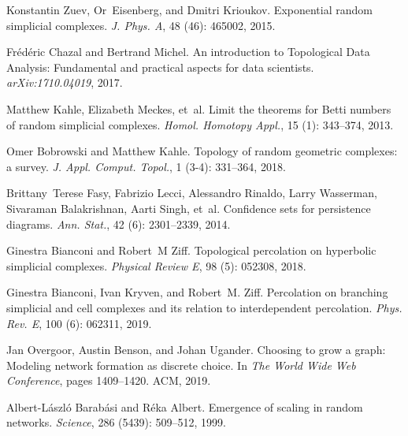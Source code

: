 Konstantin Zuev, Or~Eisenberg, and Dmitri Krioukov.
\newblock Exponential random simplicial complexes.
\newblock \emph{J. Phys. A}, 48 (46): 465002, 2015.

Fr{\'e}d{\'e}ric Chazal and Bertrand Michel.
\newblock An introduction to {{Topological Data Analysis}}: Fundamental and
practical aspects for data scientists.
\newblock \emph{arXiv:1710.04019}, 2017.

Matthew Kahle, Elizabeth Meckes, et~al.
\newblock Limit the theorems for {{Betti}} numbers of random simplicial
complexes.
\newblock \emph{Homol. Homotopy Appl.}, 15 (1): 343--374,
2013.

Omer Bobrowski and Matthew Kahle.
\newblock Topology of random geometric complexes: a survey.
\newblock \emph{J. Appl. Comput. Topol.}, 1 (3-4): 331--364,
2018.

Brittany~Terese Fasy, Fabrizio Lecci, Alessandro Rinaldo, Larry Wasserman,
Sivaraman Balakrishnan, Aarti Singh, et~al.
\newblock Confidence sets for persistence diagrams.
\newblock \emph{Ann. Stat.}, 42 (6): 2301--2339, 2014.

Ginestra Bianconi and Robert~M Ziff.
\newblock Topological percolation on hyperbolic simplicial complexes.
\newblock \emph{Physical Review E}, 98 (5): 052308, 2018.

Ginestra Bianconi, Ivan Kryven, and Robert~M. Ziff.
\newblock Percolation on branching simplicial and cell complexes and its
relation to interdependent percolation.
\newblock \emph{Phys. Rev. E}, 100 (6): 062311, 2019.

Jan Overgoor, Austin Benson, and Johan Ugander.
\newblock Choosing to grow a graph: Modeling network formation as discrete
choice.
\newblock In \emph{The World Wide Web Conference}, pages 1409--1420. {ACM},
2019.

Albert-L{\'a}szl{\'o} Barab{\'a}si and R{\'e}ka Albert.
\newblock Emergence of scaling in random networks.
\newblock \emph{Science}, 286 (5439): 509--512, 1999.

